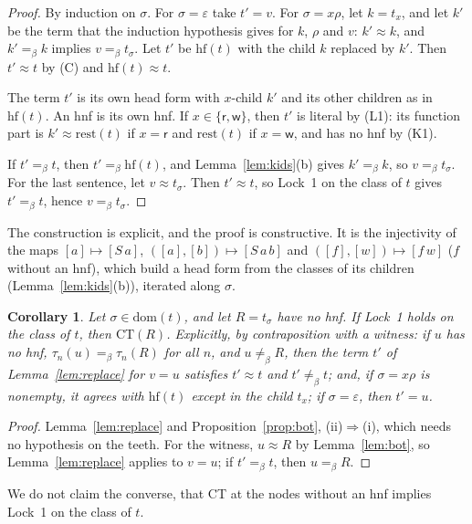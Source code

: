 \documentclass[11pt]{amsart}
\newtheorem{corollary}[theorem]{Corollary}
\theoremstyle{definition}
\newcommand{\conv}{=_\beta}
\newcommand{\nconv}{\neq_\beta}
\newcommand{\rest}{\mathrm{rest}}
\newcommand{\Hd}{\mathrm{hf}}
\newcommand{\dom}{\mathrm{dom}}
\newcommand{\lr}{\mathsf r}
\newcommand{\lw}{\mathsf w}
\newcommand{\CT}{\mathrm{CT}}
\begin{document}
\begin{proof}
By induction on $\sigma$. For $\sigma=\varepsilon$ take $t'=v$. For $\sigma=x\rho$, let $k=t_x$, and let
$k'$ be the term that the induction hypothesis gives for $k$, $\rho$ and $v$: $k'\approx k$, and
$k'\conv k$ implies $v\conv t_\sigma$. Let $t'$ be $\Hd(t)$ with the child $k$ replaced by $k'$. Then
$t'\approx t$ by (C) and $\Hd(t)\approx t$.

The term $t'$ is its own head form with $x$-child $k'$ and its other children as in $\Hd(t)$. An hnf
is its own hnf. If $x\in\{\lr,\lw\}$, then $t'$ is literal by (L1): its function part is
$k'\approx\rest(t)$ if $x=\lr$ and $\rest(t)$ if $x=\lw$, and has no hnf by (K1).

If $t'\conv t$, then $t'\conv\Hd(t)$, and Lemma~\ref{lem:kids}(b) gives $k'\conv k$, so $v\conv
t_\sigma$. For the last sentence, let $v\approx t_\sigma$. Then $t'\approx t$, so Lock~1 on the class
of $t$ gives $t'\conv t$, hence $v\conv t_\sigma$.
\end{proof}

The construction is explicit, and the proof is constructive. It is the injectivity of the maps
$[a]\mapsto[S\,a]$, $([a],[b])\mapsto[S\,a\,b]$ and $([f],[w])\mapsto[f\,w]$ ($f$ without an hnf),
which build a head form from the classes of its children (Lemma~\ref{lem:kids}(b)), iterated along
$\sigma$.

\begin{corollary}\label{cor:her}
Let $\sigma\in\dom(t)$, and let $R=t_\sigma$ have no hnf. If Lock~1 holds on the class of $t$, then
$\CT(R)$. Explicitly, by contraposition with a witness: if $u$ has no hnf, $\tau_n(u)\conv\tau_n(R)$ for
all $n$, and $u\nconv R$, then the term $t'$ of Lemma~\ref{lem:replace} for $v=u$ satisfies $t'\approx t$
and $t'\nconv t$; and, if $\sigma=x\rho$ is nonempty, it agrees with $\Hd(t)$ except in the child
$t_x$; if $\sigma=\varepsilon$, then $t'=u$.
\end{corollary}

\begin{proof}
Lemma~\ref{lem:replace} and Proposition~\ref{prop:bot}, (ii)$\Rightarrow$(i), which needs no
hypothesis on the teeth. For the witness, $u\approx R$ by Lemma~\ref{lem:bot}, so Lemma~\ref{lem:replace}
applies to $v=u$; if $t'\conv t$, then $u\conv R$.
\end{proof}

We do not claim the converse, that CT at the nodes without an hnf implies Lock~1 on the class of $t$.
\end{document}
